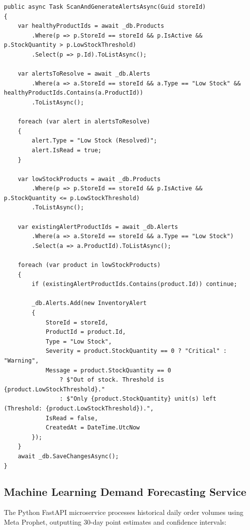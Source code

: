 \documentclass[12pt,a4paper]{report}
\begin{document}
\begin{lstlisting}[language={[Sharp]C}]
public async Task ScanAndGenerateAlertsAsync(Guid storeId)
{
    var healthyProductIds = await _db.Products
        .Where(p => p.StoreId == storeId && p.IsActive && p.StockQuantity > p.LowStockThreshold)
        .Select(p => p.Id).ToListAsync();

    var alertsToResolve = await _db.Alerts
        .Where(a => a.StoreId == storeId && a.Type == "Low Stock" && healthyProductIds.Contains(a.ProductId))
        .ToListAsync();

    foreach (var alert in alertsToResolve)
    {
        alert.Type = "Low Stock (Resolved)";
        alert.IsRead = true;
    }

    var lowStockProducts = await _db.Products
        .Where(p => p.StoreId == storeId && p.IsActive && p.StockQuantity <= p.LowStockThreshold)
        .ToListAsync();

    var existingAlertProductIds = await _db.Alerts
        .Where(a => a.StoreId == storeId && a.Type == "Low Stock")
        .Select(a => a.ProductId).ToListAsync();

    foreach (var product in lowStockProducts)
    {
        if (existingAlertProductIds.Contains(product.Id)) continue;

        _db.Alerts.Add(new InventoryAlert
        {
            StoreId = storeId,
            ProductId = product.Id,
            Type = "Low Stock",
            Severity = product.StockQuantity == 0 ? "Critical" : "Warning",
            Message = product.StockQuantity == 0
                ? $"Out of stock. Threshold is {product.LowStockThreshold}."
                : $"Only {product.StockQuantity} unit(s) left (Threshold: {product.LowStockThreshold}).",
            IsRead = false,
            CreatedAt = DateTime.UtcNow
        });
    }
    await _db.SaveChangesAsync();
}
\end{lstlisting}

\subsection{Machine Learning Demand Forecasting Service}
The Python FastAPI microservice processes historical daily order volumes using Meta Prophet, outputting 30-day point estimates and confidence intervals:
\end{document}
